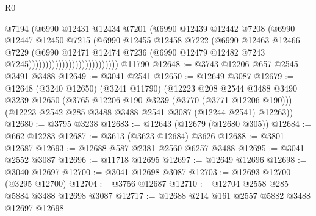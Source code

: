 \begin{lexlean}{R0}
\begin{coremodule}
                                            @7194
                                            (@6990
                                              @12431
                                              @12434
                                              @7201
                                              (@6990
                                                @12439
                                                @12442
                                                @7208
                                                (@6990
                                                  @12447
                                                  @12450
                                                  @7215
                                                  (@6990
                                                    @12455
                                                    @12458
                                                    @7222
                                                    (@6990
                                                      @12463
                                                      @12466
                                                      @7229
                                                      (@6990
                                                        @12471
                                                        @12474
                                                        @7236
                                                        (@6990
                                                          @12479
                                                          @12482
                                                          @7243
                                                          @7245)))))))))))))))))))))))))))
    @11790
@12648 := @3743 @12206 @657 @2545 @3491 @3488
@12649 := @3041 @2541
@12650 := @12649 @3087
@12679 := @12648
    (@3240 @12650)
    (@3241 @11790)
    (@12223
      @208
      @2544
      @3488
      @3490
      @3239
      @12650
      (@3765 @12206 @190 @3239 (@3770 (@3771 @12206 @190)))
      (@12223 @2542 @285 @3488 @3488 @2541 @3087 (@12244 @2541) @12263))
@12680 := @3795 @3238
@12683 := @12643 (@12679 (@12680 @305))
@12684 := @662 @12283
@12687 := @3613 (@3623 @12684) @3626
@12688 := @3801 @12687
@12693 := @12688 @587 @2381 @2560 @6257 @3488
@12695 := @3041 @2552 @3087
@12696 := @11718 @12695
@12697 := @12649 @12696
@12698 := @3040 @12697
@12700 := @3041 @12698 @3087
@12703 := @12693 @12700 (@3295 @12700)
@12704 := @3756 @12687
@12710 := @12704 @2558 @285 @5884 @3488 @12698 @3087
@12717 := @12688 @214 @161 @2557 @5882 @3488 @12697 @12698

\end{coremodule}
\end{lexlean}
